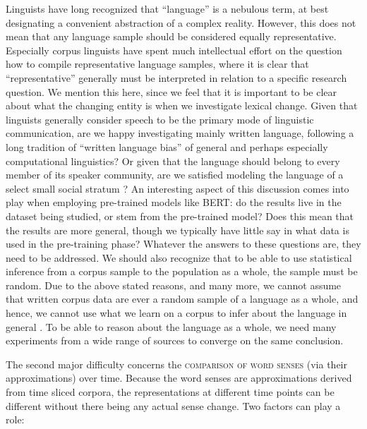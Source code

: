 \documentclass[output=paper]{langsci/langscibook}
\begin{document}
Linguists have long recognized that ``language'' is a nebulous term, at best designating a convenient abstraction of a complex reality. However, this does not mean that any language sample should be considered equally representative. Especially corpus linguists have spent much intellectual effort on the question how to compile representative language samples, where it is clear that ``representative'' generally must be interpreted in relation to a specific research question. We mention this here, since we feel that it is important to be clear about what the changing entity is when we investigate lexical change. Given that linguists generally consider speech to be the primary mode of linguistic communication, are we happy investigating mainly written language, following a long tradition of ``written
language bias'' \citep{linell-2005} of general and perhaps especially computational
linguistics? Or given that the language should belong to every member of its speaker community, are we satisfied modeling the language of a select small social stratum \citep{henrich-etal-2010,sogaard-2016}? 
An interesting aspect of this discussion comes into play when employing pre-trained models like BERT: do the results live in the dataset being studied, or stem from the pre-trained model? Does this mean that the results are more general, though we typically have little say in what data is used in the pre-training phase?
Whatever the answers to these questions are, 
they need to be addressed.
 We should also recognize that to be able to use statistical inference from a corpus sample to the population as a whole, the sample must be random. Due to the above stated reasons, and many more, we cannot assume that written corpus data are ever a random sample of a language as a whole, and hence, we cannot use what we learn on a corpus to infer about the language in general \citep{koplenig2016}. To be able to reason about the language as a whole, we need many experiments from a wide range of sources to converge on the same conclusion. 
 
The second major difficulty concerns the \textsc{comparison of word senses} (via their approximations) over time. Because the word senses are approximations derived from time sliced corpora, the representations at different time points can be different without there being any actual sense change. Two factors can play a role:\largerpage[2]
	
\end{document}
